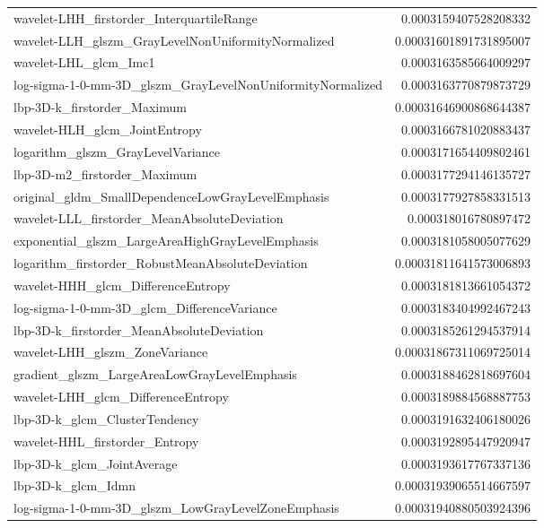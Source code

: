{\begin{xltabular}[H]{\textwidth}{X r}
        wavelet-LHH\_firstorder\_InterquartileRange & 0.0003159407528208332 \\
        wavelet-LLH\_glszm\_GrayLevelNonUniformityNormalized & 0.00031601891731895007 \\
        wavelet-LHL\_glcm\_Imc1 & 0.0003163585664009297 \\
        log-sigma-1-0-mm-3D\_glszm\_GrayLevelNonUniformityNormalized & 0.0003163770879873729 \\
        lbp-3D-k\_firstorder\_Maximum & 0.00031646900868644387 \\
        wavelet-HLH\_glcm\_JointEntropy & 0.0003166781020883437 \\
        logarithm\_glszm\_GrayLevelVariance & 0.0003171654409802461 \\
        lbp-3D-m2\_firstorder\_Maximum & 0.0003177294146135727 \\
        original\_gldm\_SmallDependenceLowGrayLevelEmphasis & 0.0003177927858331513 \\
        wavelet-LLL\_firstorder\_MeanAbsoluteDeviation & 0.000318016780897472 \\
        exponential\_glszm\_LargeAreaHighGrayLevelEmphasis & 0.0003181058005077629 \\
        logarithm\_firstorder\_RobustMeanAbsoluteDeviation & 0.00031811641573006893 \\
        wavelet-HHH\_glcm\_DifferenceEntropy & 0.0003181813661054372 \\
        log-sigma-1-0-mm-3D\_glcm\_DifferenceVariance & 0.0003183404992467243 \\
        lbp-3D-k\_firstorder\_MeanAbsoluteDeviation & 0.0003185261294537914 \\
        wavelet-LHH\_glszm\_ZoneVariance & 0.00031867311069725014 \\
        gradient\_glszm\_LargeAreaLowGrayLevelEmphasis & 0.0003188462818697604 \\
        wavelet-LHH\_glcm\_DifferenceEntropy & 0.0003189884568887753 \\
        lbp-3D-k\_glcm\_ClusterTendency & 0.0003191632406180026 \\
        wavelet-HHL\_firstorder\_Entropy & 0.0003192895447920947 \\
        lbp-3D-k\_glcm\_JointAverage & 0.0003193617767337136 \\
        lbp-3D-k\_glcm\_Idmn & 0.00031939065514667597 \\
        log-sigma-1-0-mm-3D\_glszm\_LowGrayLevelZoneEmphasis & 0.00031940880503924396 \\

\end{xltabular}}
